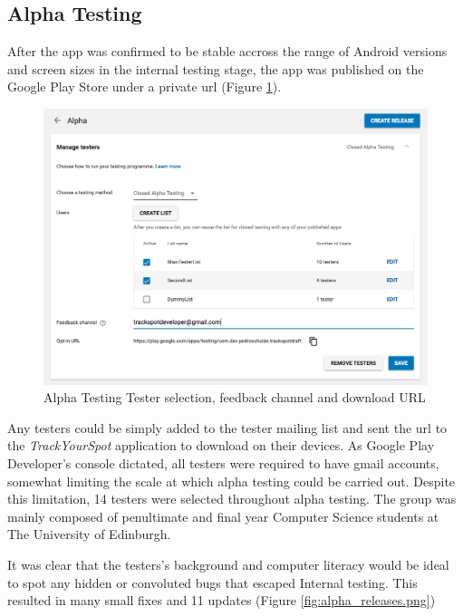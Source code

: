 \subsection{Alpha Testing}
After the app was confirmed to be stable accross the range of Android versions and screen sizes in the internal testing stage, the app was published on the Google Play Store under a private url (Figure \ref{fig:alpha_testers.png}).
\begin{figure}[H]
    \includegraphics[width=1.2\textwidth, center]{figures/alpha_testers.png}
    \caption{Alpha Testing Tester selection, feedback channel and download URL}
    \label{fig:alpha_testers.png}
\end{figure}
Any testers could be simply added to the tester mailing list and sent the url to the \emph{TrackYourSpot} application to download on their devices. As Google Play Developer's console dictated, all testers were required to have gmail accounts, somewhat limiting the scale at which alpha testing could be carried out. Despite this limitation, 14 testers were selected throughout alpha testing. The group was mainly composed of penultimate and final year Computer Science students at The University of Edinburgh.
\par It was clear that the testers's background and computer literacy would be ideal to spot any hidden or convoluted bugs that escaped Internal testing. This resulted in many small fixes and 11 updates (Figure \ref{fig:alpha_releases.png})
